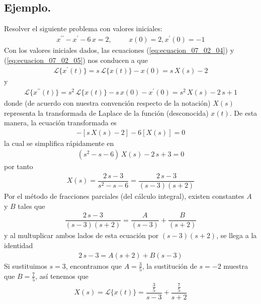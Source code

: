 \subsection*{Ejemplo.}
Resolver el siguiente problema con valores iniciales:
\begin{align*}
x^{\prime \prime} - x^{\prime} - 6 \, x = 2, \hspace{1cm} x(0)=2, x^{\prime}(0) = -1
\end{align*}
Con los valores iniciales dados, las ecuaciones (\ref{eq:ecuacion_07_02_04}) y (\ref{eq:ecuacion_07_02_05}) nos conducen a que
\begin{align*}
\mathscr{L} \{ x^{\prime}(t) \} = s \, \mathscr{L} \{ x(t) \} - x(0) =  s \, X(s) - 2
\end{align*}
y
\begin{align*}
\mathscr{L} \{ x^{\prime \prime}(t) \} = s^{2} \, \mathscr{L} \{ x(t) \} - s \, x(0) - x^{\prime} (0) =  s^{2} \, X(s) - 2 \, s +1
\end{align*}
donde (de acuerdo con nuestra convención respecto de la notación) $X(s)$ representa la transformada de Laplace de la función (desconocida) $x(t)$. De esta manera, la ecuación transformada es
\begin{align*}
[ s^{2} \, X(s) - 2 \, s + 1 ] - [ s \, X(s) - 2 ] - 6 [ X(s) ] = 0
\end{align*}
la cual se simplifica rápidamente en
\begin{align*}
(s^{2} - s - 6) \, X(s) - 2 \, s + 3 = 0
\end{align*}
por tanto
\begin{align*}
X(s) = \dfrac{2 \, s - 3}{s^{2} - s - 6} = \dfrac{2 \, s - 3}{(s-3)(s+2)}
\end{align*}
Por el método de fracciones parciales (del cálculo integral), existen constantes $A$ y $B$ tales que
\begin{align*}
\dfrac{2 \, s - 3}{(s-3)(s+2)} =  \dfrac{A}{(s - 3)} + \dfrac{B}{(s+2)}
\end{align*}
y al multuplicar ambos lados de esta ecuación por $(s-3)(s+2)$, se llega a la identidad
\begin{align*}
2 \, s - 3 = A (s + 2) +  B (s - 3)
\end{align*}
Si sustituimos $s = 3$, encontramos que $A = \frac{3}{5}$, la sustitución de $s = -2$ muestra que $B = \frac{7}{5}$, así tenemos que
\begin{align*}
X(s) = \mathscr{L} \{ x(t) \} = \dfrac{\frac{3}{5}}{s - 3} + \dfrac{\frac{7}{5}}{s + 2}
\end{align*}
